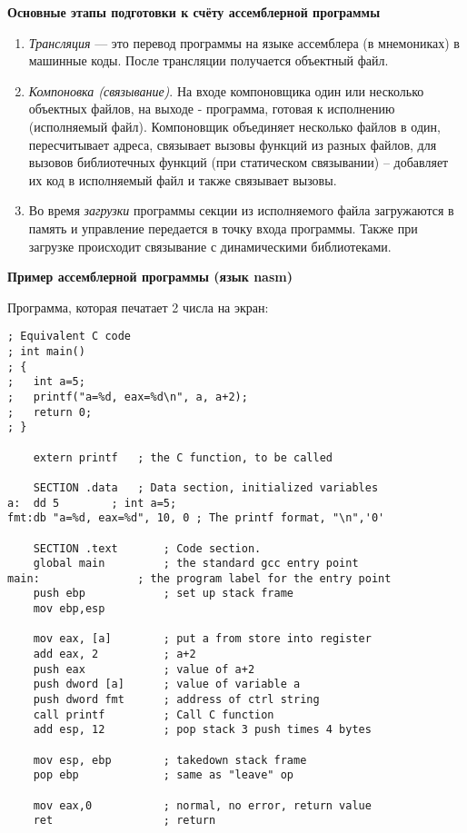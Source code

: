 \textbf{Основные этапы подготовки к счёту ассемблерной программы}

\begin{enumerate}
    \item \textit{Трансляция} --- это перевод программы на языке ассемблера (в мнемониках) в машинные коды. После трансляции получается объектный файл.
    \item \textit{Компоновка (связывание)}. На входе компоновщика один или несколько объектных файлов, на выходе - программа, готовая к исполнению (исполняемый файл). Компоновщик объединяет несколько файлов в один, пересчитывает адреса, связывает вызовы функций из разных файлов, для вызовов библиотечных функций (при статическом связывании) -- добавляет их код в исполняемый файл и также связывает вызовы.
    \item Во время \textit{загрузки} программы секции из исполняемого файла загружаются в память и управление передается в точку входа программы. Также при загрузке происходит связывание с динамическими библиотеками.
\end{enumerate}

\textbf{Пример ассемблерной программы (язык nasm)}

Программа, которая печатает 2 числа на экран:

\begin{lstlisting}[basicstyle=\ttfamily\small, frame=single] 
; Equivalent C code
; int main()
; {
;   int a=5;
;   printf("a=%d, eax=%d\n", a, a+2);
;   return 0;
; }

    extern printf	; the C function, to be called

    SECTION .data	; Data section, initialized variables
a:  dd 5		; int a=5;
fmt:db "a=%d, eax=%d", 10, 0 ; The printf format, "\n",'0'

    SECTION .text       ; Code section.
    global main         ; the standard gcc entry point
main:               ; the program label for the entry point
    push ebp            ; set up stack frame
    mov ebp,esp

    mov eax, [a]        ; put a from store into register
    add eax, 2          ; a+2
    push eax            ; value of a+2
    push dword [a]      ; value of variable a
    push dword fmt      ; address of ctrl string
    call printf         ; Call C function
    add esp, 12         ; pop stack 3 push times 4 bytes

    mov esp, ebp        ; takedown stack frame
    pop ebp             ; same as "leave" op

    mov	eax,0           ; normal, no error, return value
    ret	                ; return
\end{lstlisting}

